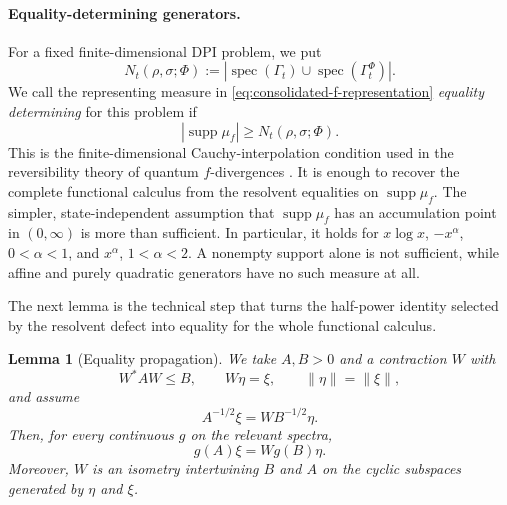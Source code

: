 \documentclass[11pt]{article}
\newtheorem{lemma}[lemma]{Lemma}
\theoremstyle{remark}
\DeclareMathOperator{\supp}{supp}
\newcommand{\1}{\mathbbm{1}}
\begin{document}
\paragraph{Equality-determining generators.}
For a fixed finite-dimensional DPI problem, we put
\begin{equation}
 N_t(\rho,\sigma;\Phi)
 :=\left|\operatorname{spec}(\Gamma_t)
 \cup\operatorname{spec}(\Gamma_t^\Phi)\right|.
 \label{eq:consolidated-equality-determining-count}
\end{equation}
We call the representing measure in
\eqref{eq:consolidated-f-representation} \emph{equality
determining} for this problem if
\begin{equation}
 |\supp\mu_f|\geq N_t(\rho,\sigma;\Phi).
 \label{eq:consolidated-equality-determining-support}
\end{equation}
This is the finite-dimensional Cauchy-interpolation condition used in
the reversibility theory of quantum $f$-divergences
\cite[Theorem~3.18(iv), especially Eq.~(3.21)]{hiai2017different}.
It is enough to recover the complete
functional calculus from the resolvent equalities on
$\supp\mu_f$.  The simpler, state-independent assumption that
$\supp\mu_f$ has an accumulation point in $(0,\infty)$ is more
than sufficient.  In particular, it holds for $x\log x$,
$-x^\alpha$, $0<\alpha<1$, and $x^\alpha$,
$1<\alpha<2$.  A nonempty support alone is not sufficient, while
affine and purely quadratic generators have no such measure at all.

The next lemma is the technical step that turns the half-power
identity selected by the resolvent defect into equality for the whole
functional calculus.

\begin{lemma}[Equality propagation]
\label{lem:consolidated-equality-propagation}
We take $A,B>0$ and a contraction $W$ with
\begin{equation}
 W^*AW\leq B,\qquad W\eta=\xi,\qquad
 \lVert\eta\rVert=\lVert\xi\rVert,
\end{equation}
and assume
\begin{equation}
 A^{-1/2}\xi=WB^{-1/2}\eta.
 \label{eq:consolidated-half-propagation}
\end{equation}
Then, for every continuous $g$ on the relevant spectra,
\begin{equation}
 g(A)\xi=Wg(B)\eta.
 \label{eq:consolidated-functional-propagation}
\end{equation}
Moreover, $W$ is an isometry intertwining $B$ and $A$ on the
cyclic subspaces generated by $\eta$ and $\xi$.
\end{lemma}
\end{document}
